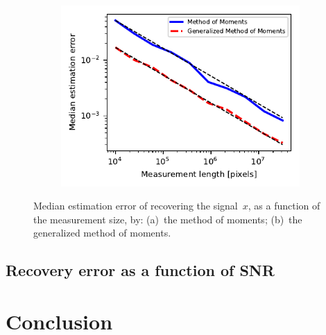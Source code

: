 \documentclass{article}
\begin{document}
\begin{figure}[!tb]
	\begin{subfigure}[ht]{\columnwidth}
		\centering
		\includegraphics[width=\columnwidth]{figures/experiment_size_err.pdf}
	\end{subfigure}
	\caption{Median estimation error of recovering the signal~$x$, as a function of the measurement size, by: (a)~the method of moments; (b)~the generalized method of moments.}
\label{fig:err_size_experiment}
\end{figure}

\subsection{Recovery error as a function of SNR}

\section{Conclusion}
\label{sec:conclusion}




\vfill \newpage



\end{document}
